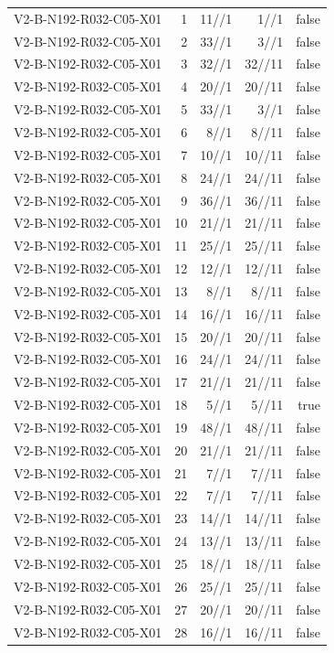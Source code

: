 {\begin{longtable}{lrrrr}
V2-B-N192-R032-C05-X01 & 1 & 11//1 & 1//1 & false \\
V2-B-N192-R032-C05-X01 & 2 & 33//1 & 3//1 & false \\
V2-B-N192-R032-C05-X01 & 3 & 32//1 & 32//11 & false \\
V2-B-N192-R032-C05-X01 & 4 & 20//1 & 20//11 & false \\
V2-B-N192-R032-C05-X01 & 5 & 33//1 & 3//1 & false \\
V2-B-N192-R032-C05-X01 & 6 & 8//1 & 8//11 & false \\
V2-B-N192-R032-C05-X01 & 7 & 10//1 & 10//11 & false \\
V2-B-N192-R032-C05-X01 & 8 & 24//1 & 24//11 & false \\
V2-B-N192-R032-C05-X01 & 9 & 36//1 & 36//11 & false \\
V2-B-N192-R032-C05-X01 & 10 & 21//1 & 21//11 & false \\
V2-B-N192-R032-C05-X01 & 11 & 25//1 & 25//11 & false \\
V2-B-N192-R032-C05-X01 & 12 & 12//1 & 12//11 & false \\
V2-B-N192-R032-C05-X01 & 13 & 8//1 & 8//11 & false \\
V2-B-N192-R032-C05-X01 & 14 & 16//1 & 16//11 & false \\
V2-B-N192-R032-C05-X01 & 15 & 20//1 & 20//11 & false \\
V2-B-N192-R032-C05-X01 & 16 & 24//1 & 24//11 & false \\
V2-B-N192-R032-C05-X01 & 17 & 21//1 & 21//11 & false \\
V2-B-N192-R032-C05-X01 & 18 & 5//1 & 5//11 & true \\
V2-B-N192-R032-C05-X01 & 19 & 48//1 & 48//11 & false \\
V2-B-N192-R032-C05-X01 & 20 & 21//1 & 21//11 & false \\
V2-B-N192-R032-C05-X01 & 21 & 7//1 & 7//11 & false \\
V2-B-N192-R032-C05-X01 & 22 & 7//1 & 7//11 & false \\
V2-B-N192-R032-C05-X01 & 23 & 14//1 & 14//11 & false \\
V2-B-N192-R032-C05-X01 & 24 & 13//1 & 13//11 & false \\
V2-B-N192-R032-C05-X01 & 25 & 18//1 & 18//11 & false \\
V2-B-N192-R032-C05-X01 & 26 & 25//1 & 25//11 & false \\
V2-B-N192-R032-C05-X01 & 27 & 20//1 & 20//11 & false \\
V2-B-N192-R032-C05-X01 & 28 & 16//1 & 16//11 & false \\

\end{longtable}}
